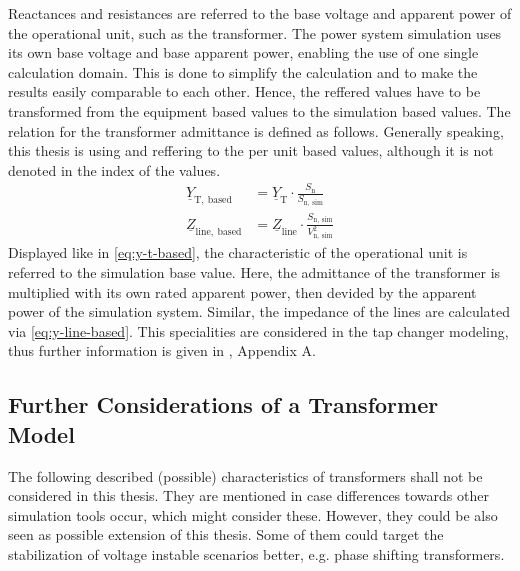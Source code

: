 Reactances and resistances are referred to the base voltage and apparent power of the operational unit, such as the transformer. 
The power system simulation uses its own base voltage and base apparent power, enabling the use of one single calculation domain. 
This is done to simplify the calculation and to make the results easily comparable to each other. 
Hence, the reffered values have to be transformed from the equipment based values to the simulation based values. 
The relation for the transformer admittance is defined as follows. 
Generally speaking, this thesis is using and reffering to the per unit based values, although it is not denoted in the index of the values.
\begin{align}
    \underline{Y}_\mathrm{T,~based}&=\underline{Y}_\mathrm{T} \cdot \frac{S_\mathrm{n}}{S_\mathrm{n,~sim}} \label{eq:y-t-based} \\[6pt]
    \underline{Z}_\mathrm{line,~based}&=\underline{Z}_\mathrm{line} \cdot \frac{S_\mathrm{n,~sim}}{V_\mathrm{n,~sim}^2} \label{eq:y-line-based}
\end{align}
Displayed like in \autoref{eq:y-t-based}, the characteristic of the operational unit is referred to the simulation base value. 
Here, the admittance of the transformer is multiplied with its own rated apparent power, then devided by the apparent power of the simulation system. 
Similar, the impedance of the lines are calculated via \autoref{eq:y-line-based}. 
This specialities are considered in the tap changer modeling, thus further information is given in \autocite{machowski_2020}, Appendix A.

\subsection{Further Considerations of a Transformer Model}
\label{sec:further-considerations}

The following described (possible) characteristics of transformers shall not be considered in this thesis.
They are mentioned in case differences towards other simulation tools occur, which might consider these.
However, they could be also seen as possible extension of this thesis.
Some of them could target the stabilization of voltage instable scenarios better, e.g. phase shifting transformers. 


